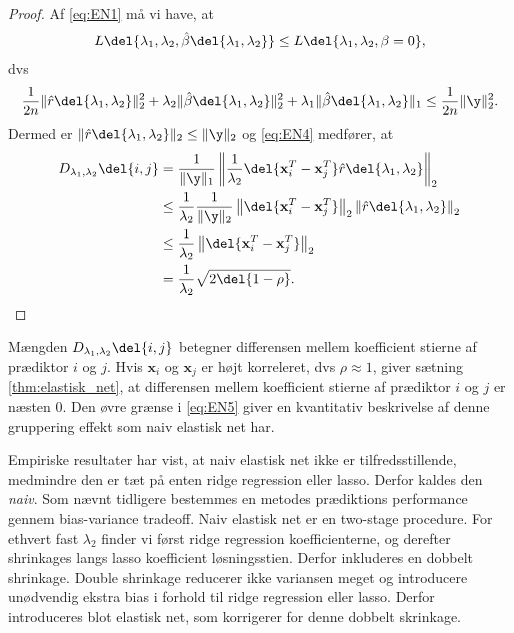\begin{proof}
Af \eqref{eq:EN1} må vi have, at
\begin{align*}
L \del{\lambda_1,\lambda_2, \hat{\beta}\del{\lambda_1, \lambda_2}} \leq L \del{\lambda_1,\lambda_2, \beta = 0},  
\end{align*}
dvs
\begin{align*}
\frac{1}{2n} \Vert \hat{r} \del{\lambda_1, \lambda_2} \Vert_2^2 + \lambda_2 \Vert \hat{\beta} \del{\lambda_1, \lambda_2} \Vert_2^2 + \lambda_1 \Vert \hat{\beta} \del{\lambda_1, \lambda_2} \Vert_1 \leq \frac{1}{2n} \Vert \y \Vert_2^2.  
\end{align*}
Dermed er \(\Vert \hat{r} \del{\lambda_1, \lambda_2} \Vert_2 \leq \Vert \y \Vert_2\) og \eqref{eq:EN4} medfører, at
\begin{align*}
D_{\lambda_1, \lambda_2} \del{i,j} &= \frac{1}{\Vert \y \Vert_1} \left\Vert \frac{1}{\lambda_2} \del{\mathbf{x}_i^T-\mathbf{x}_j^T} \hat{r}\del{\lambda_1, \lambda_2} \right\Vert_2 \\ 
&\leq \frac{1}{\lambda_2} \frac{1}{\Vert \y \Vert_2} \left\Vert \del{\mathbf{x}_i^T-\mathbf{x}_j^T} \right\Vert_2 \left\Vert \hat{r}\del{\lambda_1, \lambda_2} \right\Vert_2 \\ 
&\leq \frac{1}{\lambda_2} \left\Vert \del{\mathbf{x}_i^T-\mathbf{x}_j^T} \right\Vert_2 \\ 
&= \frac{1}{\lambda_2} \sqrt{2 \del{1-\rho}}.
\end{align*}
\end{proof}
%
Mængden \(D_{\lambda_1, \lambda_2} \del{i,j}\) betegner differensen mellem koefficient stierne af prædiktor \(i\) og \(j\).
Hvis \(\mathbf{x}_i\) og \(\mathbf{x}_j\) er højt korreleret, dvs \(\rho \approx 1\), giver sætning \ref{thm:elastisk_net}, at differensen mellem koefficient stierne af prædiktor \(i\) og \(j\) er næsten 0.
Den øvre grænse i \eqref{eq:EN5} giver en kvantitativ beskrivelse af denne gruppering effekt som naiv elastisk net har.

Empiriske resultater har vist, at naiv elastisk net ikke er tilfredsstillende, medmindre den er tæt på enten ridge regression eller lasso.
Derfor kaldes den \textit{naiv}.
Som nævnt tidligere bestemmes en metodes prædiktions performance gennem bias-variance tradeoff. 
Naiv elastisk net er en two-stage procedure. For ethvert fast \(\lambda_2\) finder vi først ridge regression koefficienterne, og derefter shrinkages langs lasso koefficient løsningsstien. Derfor inkluderes en dobbelt shrinkage.
Double shrinkage reducerer ikke variansen meget og introducere unødvendig ekstra bias i forhold til ridge regression eller lasso.
Derfor introduceres blot elastisk net, som korrigerer for denne dobbelt skrinkage.

